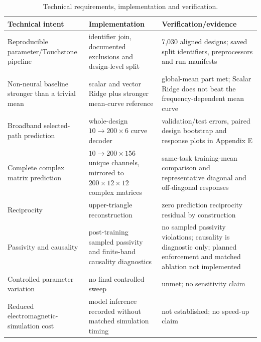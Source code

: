\begin{table}[t]
    \caption{Technical requirements, implementation and verification.}
    \label{tab:appendix-d-traceability}
    \centering
    \scriptsize
    \begin{tabular}{@{}p{}p{}
                         p{}@{}}
        \toprule
        Technical intent & Implementation & Verification/evidence \\
        \midrule
        Reproducible parameter/Touchstone pipeline
          & identifier join, documented exclusions and design-level split
          & 7,030 aligned designs; saved split identifiers, preprocessors and
            run manifests \\
        Non-neural baseline stronger than a trivial mean
          & scalar and vector Ridge plus stronger mean-curve reference
          & global-mean part met; Scalar Ridge does not beat the
            frequency-dependent mean curve \\
        Broadband selected-path prediction
          & whole-design $10\rightarrow200\times6$ curve decoder
          & validation/test errors, paired design bootstrap and response plots
            in Appendix E \\
        Complete complex matrix prediction
          & $10\rightarrow200\times156$ unique channels, mirrored to
            $200\times12\times12$ complex matrices
          & same-task training-mean comparison and representative diagonal and
            off-diagonal responses \\
        Reciprocity
          & upper-triangle reconstruction
          & zero prediction reciprocity residual by construction \\
        Passivity and causality
          & post-training sampled passivity and finite-band causality diagnostics
          & no sampled passivity violations; causality is diagnostic only;
            planned enforcement and matched ablation not implemented \\
        Controlled parameter variation
          & no final controlled sweep
          & unmet; no sensitivity claim \\
        Reduced electromagnetic-simulation cost
          & model inference recorded without matched simulation timing
          & not established; no speed-up claim \\
        \bottomrule
    \end{tabular}
\end{table}

